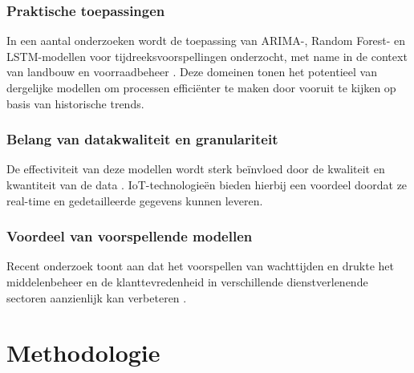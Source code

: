 \subsubsection{Praktische toepassingen}
In een aantal onderzoeken wordt de toepassing van ARIMA-, Random Forest- en LSTM-modellen voor tijdreeksvoorspellingen onderzocht, met name in de context van landbouw en voorraadbeheer \autocite{Nagendra2023}. Deze domeinen tonen het potentieel van dergelijke modellen om processen efficiënter te maken door vooruit te kijken op basis van historische trends.

\subsubsection{Belang van datakwaliteit en granulariteit}
De effectiviteit van deze modellen wordt sterk beïnvloed door de kwaliteit en kwantiteit van de data \autocite{Mani2021}. IoT-technologieën bieden hierbij een voordeel doordat ze real-time en gedetailleerde gegevens kunnen leveren.

\subsubsection{Voordeel van voorspellende modellen}
Recent onderzoek toont aan dat het voorspellen van wachttijden en drukte het middelenbeheer en de klanttevredenheid in verschillende dienstverlenende sectoren aanzienlijk kan verbeteren \autocite{Benevento2021}.



\section{Methodologie}%
\label{sec:methodologie}



